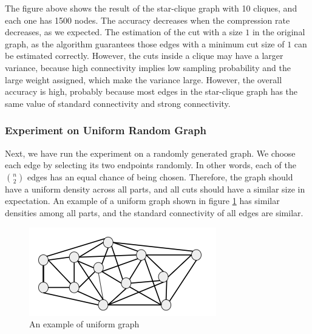\documentclass{article}
\begin{document}

The figure above shows the result of the star-clique graph with 10 cliques, and each one has 1500 nodes. The accuracy decreases when the compression rate decreases, as we expected. The estimation of the cut with a size $1$ in the original graph, as the algorithm guarantees those edges with a minimum cut size of $1$ can be estimated correctly. However, the cuts inside a clique may have a larger variance, because high connectivity implies low sampling probability and the large weight assigned, which make the variance large. However, the overall accuracy is high, probably because most edges in the star-clique graph has the same value of standard connectivity and strong connectivity.

\subsubsection{Experiment on Uniform Random Graph}
Next, we have run the experiment on a randomly generated graph. We choose each edge by selecting its two endpoints randomly. In other words, each of the $n \choose 2$ edges has an equal chance of being chosen. Therefore, the graph should have a uniform density across all parts, and all cuts should have a similar size in expectation. An example of a uniform graph shown in figure \ref{fig:unifrom_graph} has similar densities among all parts, and the standard connectivity of all edges are similar.

\begin{figure}[h!]
\centering
\includegraphics[scale=0.5]{images/uni_graph.png}
\caption{An example of uniform graph}
\label{fig:unifrom_graph}
\end{figure}
\end{document}
